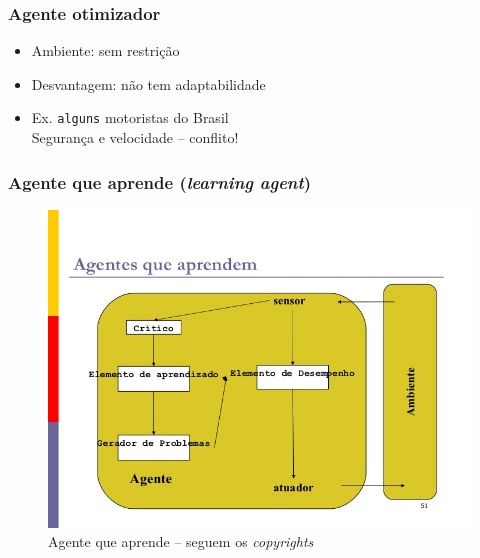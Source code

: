 
\begin{frame} %

    \frametitle{Agente otimizador}

\begin{itemize}
  \item Ambiente: sem restrição
  
  \item Desvantagem: não  tem adaptabilidade
  
  \item Ex. \texttt{alguns} motoristas do Brasil\\
    Segurança e velocidade – conflito!
  
\end{itemize}
\end{frame}




\begin{frame} %

 \frametitle{Agente que aprende (\textit{learning agent})}

\begin{figure}[!ht]
  \centering
  \includegraphics[height =.6\textheight,width=.7\textwidth]
  {figuras/agentes_que_aprendem.jpg}
  \caption{Agente que aprende -- seguem os \textit{copyrights}}
\end{figure}

\end{frame}





